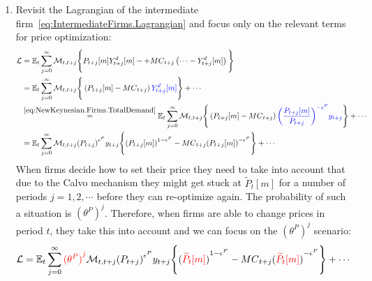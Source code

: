 \begin{enumerate}
\item
Revisit the Lagrangian of the intermediate firm~\eqref{eq:IntermediateFirms.Lagrangian}
  and focus only on the relevant terms for price optimization:
\begin{align*}
\mathcal{L} &= \mathbb{E}_{t} \sum_{j=0}^{\infty} \mathcal{M}_{t,t+j} \Bigg \{
P_{t+j}[m] Y^{d}_{t+j}[m] - 
+ {MC}_{t+j} \left(
  \cdots - Y^{d}_{t+j}[m]\right)
\Bigg \}
\\
&= \mathbb{E}_{t} \sum_{j=0}^{\infty} \mathcal{M}_{t,t+j} \Bigg \{
\left(P_{t+j}[m] - {MC}_{t+j}\right) {\color{blue}Y^{d}_{t+j}[m]}
\Bigg \} + \cdots
\\
&\overset{\eqref{eq:NewKeynesian.Firms.TotalDemand}}{=} \mathbb{E}_{t} \sum_{j=0}^{\infty} \mathcal{M}_{t,t+j} \Bigg \{
\left(P_{t+j}[m] - {MC}_{t+j}\right) {\color{blue} {\left(\frac{P_{t+j}[m]}{P_{t+j}}\right)}^{-\epsilon^{P}} y_{t+j}}
\Bigg \} + \cdots
\\
&= \mathbb{E}_{t} \sum_{j=0}^{\infty} \mathcal{M}_{t,t+j} {(P_{t+j})}^{\epsilon^{P}} y_{t+j}
\Bigg \{
{(P_{t+j}[m])}^{1-\epsilon^{P}} - {MC}_{t+j}{(P_{t+j}[m])}^{-\epsilon^{P}}
\Bigg \} + \cdots
\end{align*}
When firms decide how to set their price they need to take into account
  that due to the Calvo mechanism they might get stuck at \(\widetilde{P}_{t}[m]\) for a number of periods \(j=1,2,\cdots \)
  before they can re-optimize again.
The probability of such a situation is \({(\theta^P)}^{j}\).
Therefore, when firms are able to change prices in period \(t\),
  they take this into account and we can focus on the \({(\theta^P)}^{j}\) scenario:
\begin{align*}
\mathcal{L} &= 
\mathbb{E}_{t} \sum_{j=0}^{\infty} {\color{red} {(\theta^P)}^{j}} \mathcal{M}_{t,t+j} {(P_{t+j})}^{\epsilon^{P}} y_{t+j}
\Bigg \{
{({\color{red} \widetilde{P}_{t}[m]})}^{1-\epsilon^{P}} - {MC}_{t+j}{({\color{red} \widetilde{P}_{t}[m]})}^{-\epsilon^{P}}
\Bigg \} + \cdots
\end{align*}


\end{enumerate}
